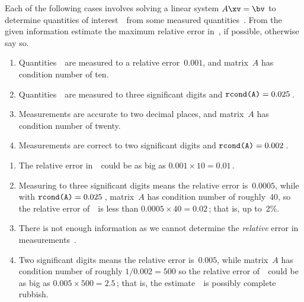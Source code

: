 \begin{example} \label{eg:}
Each of the following cases involves solving a linear system \(A\xv=\bv\) to determine quantities of interest~\xv\ from some measured quantities~\bv.
From the given information estimate the maximum relative error in~\xv,  if  possible, otherwise say so.
\begin{enumerate}
\item Quantities~\bv\ are measured to a relative error~\(0.001\), and matrix~\(A\) has condition number of ten.
\item Quantities~\bv\ are measured to three significant digits and \(\verb|rcond(A)|=0.025\)\,.
\item Measurements are accurate to two decimal places, and matrix~\(A\) has condition number of twenty.
\item  Measurements are correct to two significant digits and \(\verb|rcond(A)|=0.002\)\,.
\end{enumerate}

\begin{solution} 
\begin{enumerate}
\item The relative error in~\xv\ could be as big as \(0.001\times10=0.01\)\,.
\item Measuring to three significant digits means the relative error is~\(0.0005\), while with \(\verb|rcond(A)|=0.025\)\,, matrix~\(A\) has condition number of roughly~\(40\), so the relative error of~\xv\ is less than \(0.0005\times40=0.02\)\,; that is, up to~2\%.
\item There is not enough information as we cannot determine the \emph{relative} error in measurements~\bv.
\item Two significant digits means the relative error is~\(0.005\), while matrix~\(A\) has condition number of roughly \(1/0.002=500\) so the relative error of~\xv\ could be as big as \(0.005\times500=2.5\)\,; that is, the estimate~\xv\ is possibly complete rubbish.
\end{enumerate}
\end{solution}
\end{example}




